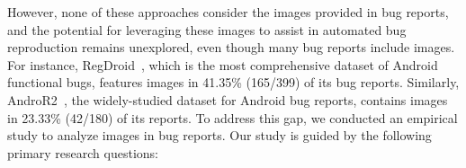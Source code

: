 However, none of these approaches consider the images provided in bug reports, and the potential for leveraging these images to assist in automated bug reproduction remains unexplored, even though many bug reports include images. For instance, RegDroid~\cite{xiong2023empirical}, which is the most comprehensive dataset of Android functional bugs, features images in 41.35\% (165/399) of its bug reports. 
Similarly, AndroR2~\cite{johnson2022empirical, wendland2021andror2}, the widely-studied dataset for Android bug reports, contains images in 23.33\% (42/180) of its reports. 
%
% 
To address this gap, we conducted an empirical study to analyze images in bug reports. Our study is guided by the following primary research questions:



